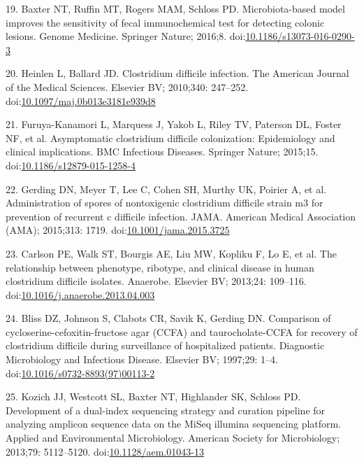 \documentclass[11pt,]{article}
\begin{document}
19. Baxter NT, Ruffin MT, Rogers MAM, Schloss PD. Microbiota-based model
improves the sensitivity of fecal immunochemical test for detecting
colonic lesions. Genome Medicine. Springer Nature; 2016;8.
doi:\href{http://dx.doi.org/10.1186/s13073-016-0290-3}{10.1186/s13073-016-0290-3}

20. Heinlen L, Ballard JD. Clostridium difficile infection. The American
Journal of the Medical Sciences. Elsevier BV; 2010;340: 247--252.
doi:\href{http://dx.doi.org/10.1097/maj.0b013e3181e939d8}{10.1097/maj.0b013e3181e939d8}

21. Furuya-Kanamori L, Marquess J, Yakob L, Riley TV, Paterson DL,
Foster NF, et al. Asymptomatic clostridium difficile colonization:
Epidemiology and clinical implications. BMC Infectious Diseases.
Springer Nature; 2015;15.
doi:\href{http://dx.doi.org/10.1186/s12879-015-1258-4}{10.1186/s12879-015-1258-4}

22. Gerding DN, Meyer T, Lee C, Cohen SH, Murthy UK, Poirier A, et al.
Administration of spores of nontoxigenic clostridium difficile strain m3
for prevention of recurrent c difficile infection. JAMA. American
Medical Association (AMA); 2015;313: 1719.
doi:\href{http://dx.doi.org/10.1001/jama.2015.3725}{10.1001/jama.2015.3725}

23. Carlson PE, Walk ST, Bourgis AE, Liu MW, Kopliku F, Lo E, et al. The
relationship between phenotype, ribotype, and clinical disease in human
clostridium difficile isolates. Anaerobe. Elsevier BV; 2013;24:
109--116.
doi:\href{http://dx.doi.org/10.1016/j.anaerobe.2013.04.003}{10.1016/j.anaerobe.2013.04.003}

24. Bliss DZ, Johnson S, Clabots CR, Savik K, Gerding DN. Comparison of
cycloserine-cefoxitin-fructose agar (CCFA) and taurocholate-CCFA for
recovery of clostridium difficile during surveillance of hospitalized
patients. Diagnostic Microbiology and Infectious Disease. Elsevier BV;
1997;29: 1--4.
doi:\href{http://dx.doi.org/10.1016/s0732-8893(97)00113-2}{10.1016/s0732-8893(97)00113-2}

25. Kozich JJ, Westcott SL, Baxter NT, Highlander SK, Schloss PD.
Development of a dual-index sequencing strategy and curation pipeline
for analyzing amplicon sequence data on the MiSeq illumina sequencing
platform. Applied and Environmental Microbiology. American Society for
Microbiology; 2013;79: 5112--5120.
doi:\href{http://dx.doi.org/10.1128/aem.01043-13}{10.1128/aem.01043-13}
\end{document}
